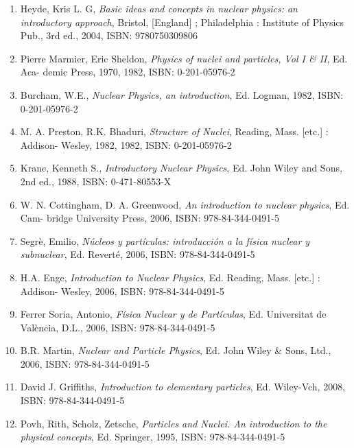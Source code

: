 \documentclass[a4paper,12pt,twoside]{article}
\begin{document}
\begin{enumerate}
\item Heyde, Kris L. G, \textit{Basic ideas and concepts in nuclear physics: an introductory approach}, Bristol, [England] ; Philadelphia : Institute of Physics Pub., 3rd ed., 2004, ISBN: 9780750309806

\item Pierre Marmier, Eric Sheldon, \textit{Physics of nuclei and particles, Vol I \& II}, Ed. Aca-
demic Press, 1970, 1982, ISBN: 0-201-05976-2

\item Burcham, W.E., \textit{Nuclear Physics, an introduction}, Ed. Logman, 1982, ISBN: 0-201-05976-2

\item M. A. Preston, R.K. Bhaduri, \textit{Structure of Nuclei}, Reading, Mass. [etc.] : Addison-
Wesley, 1982, 1982, ISBN: 0-201-05976-2

\item Krane, Kenneth S., \textit{Introductory Nuclear Physics}, Ed. John Wiley and Sons, 2nd
ed., 1988, ISBN: 0-471-80553-X

\item W. N. Cottingham, D. A. Greenwood, \textit{An introduction to nuclear physics}, Ed. Cam-
bridge University Press, 2006, ISBN: 978-84-344-0491-5

\item Segrè, Emilio, \textit{Núcleos y partículas: introducción a la física nuclear y subnuclear},
Ed. Reverté, 2006, ISBN: 978-84-344-0491-5

\item H.A. Enge, \textit{Introduction to Nuclear Physics}, Ed. Reading, Mass. [etc.] : Addison-
Wesley, 2006, ISBN: 978-84-344-0491-5

\item Ferrer Soria, Antonio, \textit{Física Nuclear y de Partículas}, Ed. Universitat de València,
D.L., 2006, ISBN: 978-84-344-0491-5

\item B.R. Martin, \textit{Nuclear and Particle Physics}, Ed. John Wiley \& Sons, Ltd., 2006,
ISBN: 978-84-344-0491-5

\item David J. Griffiths, \textit{Introduction to elementary particles}, Ed. Wiley-Vch, 2008, ISBN:
978-84-344-0491-5

\item Povh, Rith, Scholz, Zetsche, \textit{Particles and Nuclei. An introduction to the physical
concepts}, Ed. Springer, 1995, ISBN: 978-84-344-0491-5


\end{enumerate}
\end{document}
